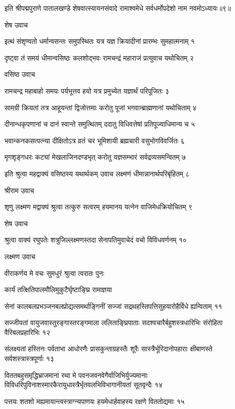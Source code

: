 इति श्रीपद्मपुराणे पातालखण्डे शेषवात्स्यायनसंवादे रामाश्वमेधे सर्वधर्मोपदेशो नाम नवमोऽध्यायः॥९॥


शेष उवाच

इत्थं संशृण्वतो धर्मान्वसन्तः समुपस्थितः
यत्र यज्ञ क्रियादीनां प्रारम्भः सुमहात्मनाम् १

दृष्ट्वा तं समयं धीमान्वसिष्ठः कलशोद्भवः
रामचन्द्रं महाराजं प्रत्युवाच यथोचितम् २

वसिष्ठ उवाच

रामचन्द्र महाबाहो समयः पर्यभूत्तव
हयो यत्र प्रमुच्येत यज्ञार्थं परिपूजितः ३

सामग्री क्रियतां तत्र आहूयन्तां द्विजोत्तमाः
करोतु पूजां भगवान्ब्राह्मणानां यथोचिताम् ४

दीनान्धकृपणानां च दानं स्वान्ते समुत्थितम्
ददातु विधिवत्तेषां प्रतिपूज्याधिमान्य च ५

भवान्कनकसत्पत्न्या दीक्षितोऽत्र व्रतं चर
भूमिशायी ब्रह्मचारी वसुभोगविवर्जितः ६

मृगशृङ्गधरः कट्यां मेखलाजिनदण्डभृत्
करोतु यज्ञसम्भारं सर्वद्रव्यसमन्वितम् ७

इति श्रुत्वा महद्वाक्यं वसिष्ठस्य यथार्थकम्
उवाच लक्ष्मणं धीमान्नानार्थपरिबृंहितम् ८

श्रीराम उवाच

शृणु लक्ष्मण मद्वाक्यं श्रुत्वा तत्कुरु सत्वरम्
हयमानय यत्नेन वाजिमेधक्रियोचितम् ९

शेष उवाच

श्रुत्वा वाक्यं रघुपतेः शत्रुजिल्लक्ष्मणस्तदा
सेनापतिमुवाचेदं वचो विविधवर्णनम् १०

लक्ष्मण उवाच

वीराकर्णय मे वचः सुमधुरं श्रुत्वा त्वरातः पुनः

कार्यं तत्क्षितिपालमौलिमुकुटैर्घृष्टाङ्घ्रि रामाज्ञया

सेनां कालबलप्रभञ्जनबलप्रोद्यत्समर्थाङ्गिनीं
सज्जां सद्रथहस्तिपत्तिसुहयारोहैर्विधे ह्यन्विताम् ११

सज्जीयतां वायुजवास्तुरङ्गास्तरङ्गमाला ललिताङ्घ्रिपाताः
सदश्वचारैर्बहुशस्त्रधारिभिः संरोहिता वैरिबलप्रहारिभिः १२

संलक्ष्यतां हस्तिनः पर्वताभा आधोरणैः प्रासकुन्ताग्रहस्तैः
शूरैः सास्त्रैर्भूरिदानोपहाराः क्षीबाणस्ते सर्वशस्त्रास्त्रपूर्णाः १३

विततबहुसमृद्धिभ्राजमाना रथा मे पवनजवनवेगैर्वाजिभिर्युज्यमानाः
विविधरिपुविनाशस्मारकैरायुधास्त्रैर्भृतवलभिविभागानीयतां सूतवृन्दैः १४

पत्तयः शतशो मह्यमायान्त्वस्त्राग्न्यपाणयः
हयमेधार्हवाहस्य रक्षणे विततोद्यमाः १५

